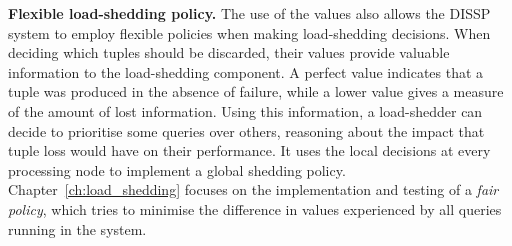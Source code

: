 \textbf{Flexible \mbox{load-shedding} policy.}
The use of the \sic values also allows the DISSP system to employ flexible policies when making
load-shedding decisions. When deciding which tuples should be discarded, their \sic values provide
valuable information to the load-shedding component. A perfect value indicates that a tuple was produced
in the absence of failure, while a lower value gives a measure of the amount of lost information. 
Using this information, a load-shedder can decide to prioritise some queries over others,
reasoning about the impact that tuple loss would have on their performance. It uses the local
decisions at every processing node to implement a global shedding policy.
Chapter~\ref{ch:load_shedding} focuses on the implementation and testing of a \emph{fair
policy}, which tries to minimise the difference in \sic values experienced by all queries running in
the system.



\begin{comment}
\paragraph{Extensibility} The second main design choice has been \emph{extensibility}. Together with a
set of traditional operators taken from the relational database world, such as Average, Filter, Top-K and so forth, a complete system
should easily allow the implementation of \emph{custom operators}. Even though a great deal of processing
can be carried out with a limited set of operators, many times it is necessary to introduce some new
operators, designed according to the user needs. For instance when dealing with the processing of social
media data, a query could deal with the sentiment analysis of the content, thus requiring the use of
Natural Language Processing operators. The same is true for financial operators implementing proprietary
trading algorithms. For these reasons it was decided to provide the implementation of some generic
operators while allowing the easy implementation of new ones. 
\end{comment}

